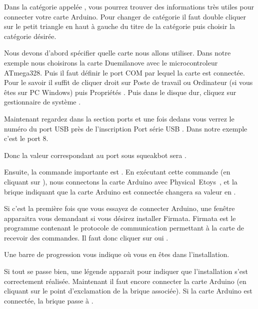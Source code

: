 \documentclass[french]{etoys-guide}
\def\appName{Physical~Etoys~}
\begin{document}

Dans la catégorie appelée , vous pourrez trouver
des informations très utiles pour connecter votre carte Arduino. Pour changer
de catégorie il faut double cliquer sur le petit triangle en haut à gauche du
titre de la catégorie puis choisir la catégorie désirée.


Nous devons d'abord spécifier quelle carte nous allons utiliser. Dans notre
exemple nous choisirons la carte Duemilanove avec le microcontroleur ATmega328.
Puis il faut définir le port COM par lequel la carte est connectée. Pour le
savoir il suffit de cliquer droit sur \og Poste de travail \fg ou \og Ordinateur \fg (si
vous êtes sur PC Windows) puis \og Propriétés \fg. Puis dans le disque dur, cliquez
sur \og gestionnaire de système \fg.


Maintenant regardez dans la section \og ports \fg et une fois dedans vous verrez le
numéro du port USB près de l'inscription \og Port série USB \fg. Dans notre exemple
c'est le port 8.
 

Donc la valeur correspondant au port sous squeakbot sera .


Ensuite, la commande importante est . En exécutant cette
commande (en cliquant sur ), nous connectons la carte Arduino avec \appName, et la brique
indiquant que la carte Arduino est connectée changera sa valeur en .


Si  c'est la première fois que vous essayez de connecter Arduino, une fenêtre
apparaitra vous demandant si vous désirez installer Firmata. Firmata est le
programme contenant le protocole de communication permettant à la carte de
recevoir des commandes. Il faut donc cliquer sur \og oui \fg.


Une barre de progression vous indique où vous en êtes dans l'installation.
 

Si tout se passe bien, une légende apparait pour indiquer que l'installation
s'est correctement réalisée. Maintenant il faut encore connecter la carte
Arduino (en cliquant sur le  point d'exclamation de la brique associée). Si la
carte Arduino est connectée, la brique  passe à
.
\end{document}
